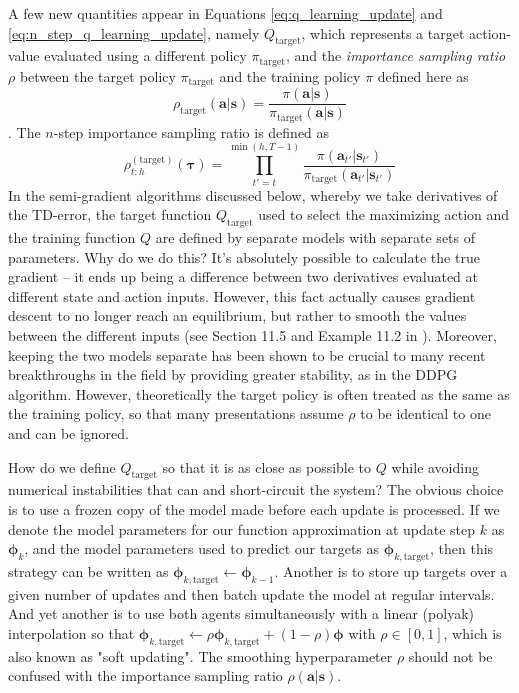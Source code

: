 \documentclass{article}
\begin{document}
A few new quantities appear in Equations \ref{eq:q_learning_update} and \ref{eq:n_step_q_learning_update}, namely $Q_\text{target}$, which represents a target action-value evaluated using a different policy $\pi_\text{target}$, and the \textit{importance sampling ratio} $\rho$ between the target policy $\pi_\text{target}$ and the training policy $\pi$ defined here as \begin{equation}\rho_\text{target}(\mathbf{a}|\mathbf{s})=\frac{\pi(\mathbf{a}|\mathbf{s})}{\pi_\text{target}(\mathbf{a}|\mathbf{s})}\end{equation}. The $n$-step importance sampling ratio is defined as \begin{equation}\rho^{(\text{target})}_{t:h}(\boldsymbol{\tau})=\prod_{t'=t}^{\min(h,T-1)}\frac{\pi(\mathbf{a}_{t'}|\mathbf{s}_{t'})}{\pi_\text{target}(\mathbf{a}_{t'}|\mathbf{s}_{t'})}\end{equation}
In the semi-gradient algorithms discussed below, whereby we take derivatives of the TD-error, the target function  $Q_\text{target}$ used to select the maximizing action and the training function  $Q$ are defined by separate models with separate sets of parameters. Why do we do this? It's absolutely possible to calculate the true gradient -- it ends up being a difference between two derivatives evaluated at different state and action inputs. However, this fact actually causes gradient descent to no longer reach an equilibrium, but rather to smooth the values between the different inputs (see Section 11.5 and Example 11.2 in \cite{sutton_barto_rl}). Moreover, keeping the two models separate has been shown to be crucial to many recent breakthroughs in the field by providing greater stability, as in the DDPG algorithm\cite{DDPG}. However, theoretically the target policy is often treated as the same as the training policy, so that many presentations assume $\rho$ to be identical to one and can be ignored.

How do we define $Q_\text{target}$ so that it is as close as possible to $Q$ while avoiding numerical instabilities that can and short-circuit the system? The obvious choice is to use a frozen copy of the model made before each update is processed. If we denote the model parameters for our function approximation at update step $k$  as $\boldsymbol{\phi}_k$, and the model parameters used to predict our targets as  $\boldsymbol{\phi}_{k,\text{target}}$, then this strategy can be written as $\boldsymbol{\phi}_{k,\text{target}}\leftarrow\boldsymbol{\phi}_{k-1}$.  Another is to store up targets over a given number of updates and then batch update the model at regular intervals. And yet another is to use both agents simultaneously with a linear (polyak) interpolation so that $\boldsymbol{\phi}_{k,\text{target}}\leftarrow \rho\boldsymbol{\phi}_{k,\text{target}}+(1-\rho)\boldsymbol{\phi}$ with $\rho\in[0,1]$, which is also known as "soft updating". The smoothing hyperparameter $\rho$ should not be confused with the importance sampling ratio $\rho(\mathbf{a}|\mathbf{s})$.
\end{document}

